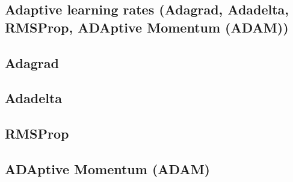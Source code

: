 
\subsection{Adaptive learning rates (Adagrad, Adadelta, RMSProp, ADAptive Momentum (ADAM))}

\subsection{Adagrad}

\subsection{Adadelta}

\subsection{RMSProp}

\subsection{ADAptive Momentum (ADAM)}


